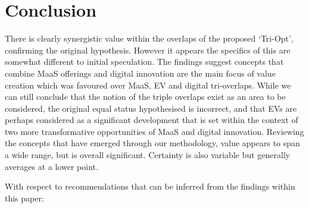 \documentclass[journal]{IEEEtran}
\begin{document}


 



\section{Conclusion}\label{conclusion}

There is clearly synergistic value within the overlaps of the proposed
`Tri-Opt', confirming the original hypothesis. However it appears the
specifics of this are somewhat different to initial speculation. The
findings suggest concepts that combine MaaS offerings and digital
innovation are the main focus of value creation which was favoured over
MaaS, EV and digital tri-overlaps. While we can still conclude that
the notion of the triple overlaps exist as an area to be considered,
the original equal status hypothesised is incorrect, and that EVs are
perhaps considered as a significant development that is set within the
context of two more transformative opportunities of MaaS and digital
innovation. Reviewing the concepts that have emerged through our
methodology, value appears to span a wide range, but is overall
significant. Certainty is also variable but generally averages at a
lower point.

With respect to recommendations that can be inferred from the findings
within this paper:
\end{document}
